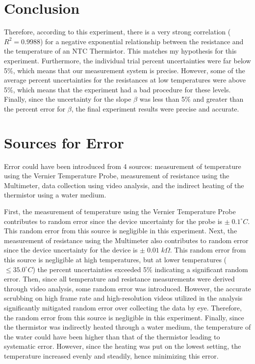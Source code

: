 \section{Conclusion}
Therefore, according to this experiment, there is a very strong correlation ($R^2=0.9988$) for a negative exponential relationship between the resistance and the temperature of an NTC Thermistor.
This matches my hypothesis for this experiment. Furthermore, the individual trial percent uncertainties were far below 5\%, which means that our measurement system is precise. However, some of the average percent uncertainties for the resistances at low temperatures were above 5\%, which means that the experiment had a bad procedure for these levels. Finally, since the uncertainty for the slope $\beta$ was less than 5\% and greater than the percent error for $\beta$, the final experiment results were precise and accurate.

\section{Sources for Error}
Error could have been introduced from 4 sources: measurement of temperature using the Vernier Temperature Probe, measurement of resistance using the Multimeter, data collection using video analysis, and the indirect heating of the thermistor using a water medium.

First, the measurement of temperature using the Vernier Temperature Probe contributes to random error since the device uncertainty for the probe is $\pm\;0.1^\circ C$. This random error from this source is negligible in this experiment. Next, the measurement of resistance using the Multimeter also contributes to random error since the device uncertainty for the device is $\pm\;0.01\;k\Omega$. This random error from this source is negligible at high temperatures, but at lower temperatures ($\le 35.0^\circ C$) the percent uncertainties exceeded 5\% indicating a significant random error. Then, since all temperature and resistance measurements were derived through video analysis, some random error was introduced. However, the accurate scrubbing on high frame rate and high-resolution videos utilized in the analysis significantly mitigated random error over collecting the data by eye. Therefore, the random error from this source is negligible in this experiment. Finally, since the thermistor was indirectly heated through a water medium, the temperature of the water could have been higher than that of the thermistor leading to systematic error. However, since the heating was put on the lowest setting, the temperature increased evenly and steadily, hence minimizing this error.

